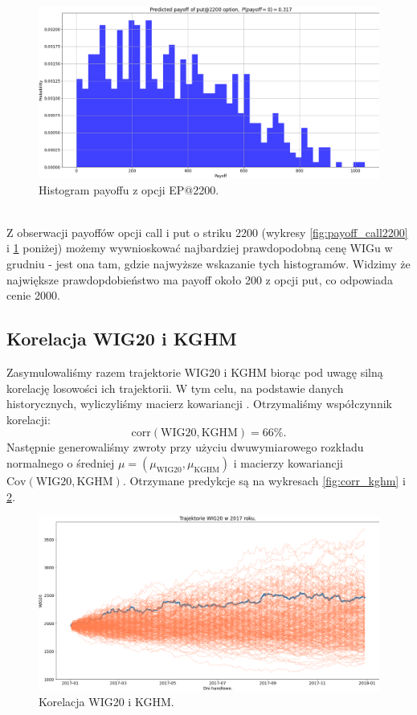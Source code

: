 \documentclass[12pt]{article}
\newcommand{\Cov}{\mathrm{Cov}}
\newcommand{\corr}{\mathrm{corr}}
\begin{document}
\begin{figure}[htp]
    \centering
    \includegraphics[width=\textwidth,height=\textheight,keepaspectratio]{payoff_put_2000.png}
    \caption{Histogram payoffu z opcji EP@2200.}
    \label{fig:payoff_put2200}
\end{figure}\\
Z obserwacji payoffów opcji call i put o striku 2200 (wykresy \ref{fig:payoff_call2200} i \ref{fig:payoff_put2200} poniżej) możemy wywnioskować najbardziej prawdopodobną cenę WIGu w grudniu - jest ona tam, gdzie najwyższe wskazanie tych histogramów. Widzimy że największe prawdopdobieństwo ma payoff około 200 z opcji put, co odpowiada cenie 2000.

\subsection{Korelacja WIG20 i KGHM}
Zasymulowaliśmy razem trajektorie WIG20 i KGHM biorąc pod uwagę silną korelację losowości ich trajektorii.  W tym celu, na podstawie danych historycznych, wyliczyliśmy macierz kowariancji . Otrzymaliśmy współczynnik korelacji: 
$$
\corr(\text{WIG20}, \text{KGHM}) = 66 \%.
$$
Następnie generowaliśmy zwroty przy użyciu dwuwymiarowego rozkładu normalnego o średniej $\mu = (\mu_{  \text{WIG20}}, \mu_{\text{KGHM}})$ i macierzy kowariancji $\Cov(\text{WIG20}, \text{KGHM}).$ Otrzymane predykcje są na wykresach \ref{fig:corr_kghm} i \ref{fig:corr_wig}.


\begin{figure}[H]
    \centering
    \includegraphics[width=\textwidth,height=\textheight,keepaspectratio]{corr_wig.png}
    \caption{Korelacja WIG20 i KGHM.}
    \label{fig:corr_wig}
\end{figure}
\end{document}

